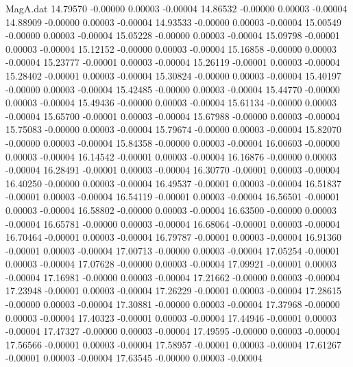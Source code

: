\begin{filecontents}{MagA.dat}
  14.79570   -0.00000    0.00003   -0.00004
  14.86532   -0.00000    0.00003   -0.00004
  14.88909   -0.00000    0.00003   -0.00004
  14.93533   -0.00000    0.00003   -0.00004
  15.00549   -0.00000    0.00003   -0.00004
  15.05228   -0.00000    0.00003   -0.00004
  15.09798   -0.00001    0.00003   -0.00004
  15.12152   -0.00000    0.00003   -0.00004
  15.16858   -0.00000    0.00003   -0.00004
  15.23777   -0.00001    0.00003   -0.00004
  15.26119   -0.00001    0.00003   -0.00004
  15.28402   -0.00001    0.00003   -0.00004
  15.30824   -0.00000    0.00003   -0.00004
  15.40197   -0.00000    0.00003   -0.00004
  15.42485   -0.00000    0.00003   -0.00004
  15.44770   -0.00000    0.00003   -0.00004
  15.49436   -0.00000    0.00003   -0.00004
  15.61134   -0.00000    0.00003   -0.00004
  15.65700   -0.00001    0.00003   -0.00004
  15.67988   -0.00000    0.00003   -0.00004
  15.75083   -0.00000    0.00003   -0.00004
  15.79674   -0.00000    0.00003   -0.00004
  15.82070   -0.00000    0.00003   -0.00004
  15.84358   -0.00000    0.00003   -0.00004
  16.00603   -0.00000    0.00003   -0.00004
  16.14542   -0.00001    0.00003   -0.00004
  16.16876   -0.00000    0.00003   -0.00004
  16.28491   -0.00001    0.00003   -0.00004
  16.30770   -0.00001    0.00003   -0.00004
  16.40250   -0.00000    0.00003   -0.00004
  16.49537   -0.00001    0.00003   -0.00004
  16.51837   -0.00001    0.00003   -0.00004
  16.54119   -0.00001    0.00003   -0.00004
  16.56501   -0.00001    0.00003   -0.00004
  16.58802   -0.00000    0.00003   -0.00004
  16.63500   -0.00000    0.00003   -0.00004
  16.65781   -0.00000    0.00003   -0.00004
  16.68064   -0.00001    0.00003   -0.00004
  16.70464   -0.00001    0.00003   -0.00004
  16.79787   -0.00001    0.00003   -0.00004
  16.91360   -0.00001    0.00003   -0.00004
  17.00713   -0.00000    0.00003   -0.00004
  17.05254   -0.00001    0.00003   -0.00004
  17.07628   -0.00000    0.00003   -0.00004
  17.09921   -0.00001    0.00003   -0.00004
  17.16981   -0.00000    0.00003   -0.00004
  17.21662   -0.00000    0.00003   -0.00004
  17.23948   -0.00001    0.00003   -0.00004
  17.26229   -0.00001    0.00003   -0.00004
  17.28615   -0.00000    0.00003   -0.00004
  17.30881   -0.00000    0.00003   -0.00004
  17.37968   -0.00000    0.00003   -0.00004
  17.40323   -0.00001    0.00003   -0.00004
  17.44946   -0.00001    0.00003   -0.00004
  17.47327   -0.00000    0.00003   -0.00004
  17.49595   -0.00000    0.00003   -0.00004
  17.56566   -0.00001    0.00003   -0.00004
  17.58957   -0.00001    0.00003   -0.00004
  17.61267   -0.00001    0.00003   -0.00004
  17.63545   -0.00000    0.00003   -0.00004

\end{filecontents}
